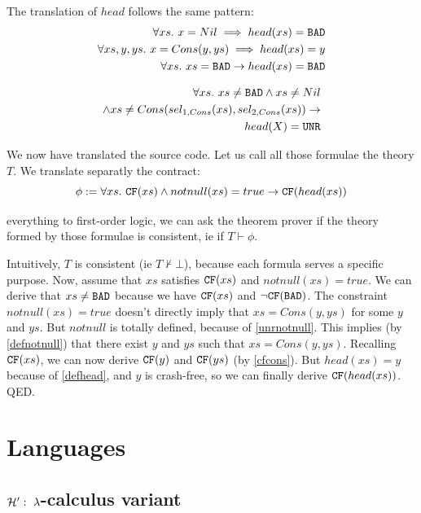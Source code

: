 \documentclass[preprint]{sigplanconf}
\begin{document}
The translation of $head$ follows the same pattern:
\begin{align}
  \forall xs.~ x=Nil \implies head(xs) = \texttt{BAD} \notag\\
  \forall xs,y,ys.~ x=Cons(y,ys) \implies head(xs) = y     \label{defhead} \\
    \forall xs.~xs=\texttt{BAD} \to head(xs) = \texttt{BAD} \notag
\end{align}

\begin{align*}
 \forall xs.~xs \neq \texttt{BAD} \land xs \neq Nil \notag \\
 \land xs \neq Cons(sel_{1,Cons}(xs),sel_{2,Cons}(xs)) \to  \notag \\
 head(X) = \texttt{UNR} 
\end{align*}

We now have translated the source code. Let us call all those formulae
the theory $T$. We translate separatly the contract:
\begin{equation*}
  \phi := \forall xs.~\texttt{CF}(xs) \land notnull(xs) = true \to \texttt{CF}(head(xs)) 
\end{equation*}

 everything to first-order logic, we can ask the
theorem prover if the theory formed by those formulae is
consistent, ie if $T \vdash \phi$.

Intuitively, $T$ is consistent (ie $T \not \vdash \bot$), because each
formula serves a specific purpose. Now, assume that $xs$ satisfies
$\texttt{CF}(xs)$ and $notnull(xs) = true$.  We can derive that $xs \neq \texttt{BAD}$
because we have $\texttt{CF}(xs)$ and $\lnot \texttt{CF}(\texttt{BAD})$. The constraint
$notnull(xs) = true$ doesn't directly imply that $xs = Cons(y,ys)$ for
some $y$ and $ys$. But $notnull$ is totally defined, because of
\eqref{unrnotnull}. This implies (by \eqref{defnotnull}) that there exist
$y$ and $ys$ such that $xs = Cons(y,ys)$. Recalling $\texttt{CF}(xs)$, we can
now derive $\texttt{CF}(y)$ and $\texttt{CF}(ys)$ (by \eqref{cfcons}). But $head(xs) =
y$ because of \eqref{defhead}, and $y$ is crash-free, so we can finally
derive $\texttt{CF}(head(xs))$. QED.


\section{Languages}
\subsection{$\mathcal{H}':~\lambda$-calculus variant}
\end{document}
